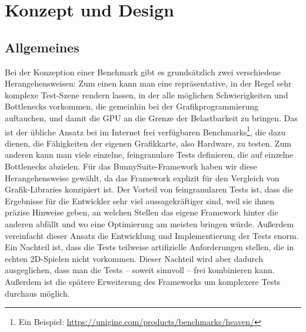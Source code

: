 \chapter{Konzept und Design}
\label{ch:konzept}
\section{Allgemeines}
Bei der Konzeption einer Benchmark gibt es grundsätzlich zwei verschiedene Herangehensweisen: Zum einen kann man eine repräsentative, in der Regel sehr komplexe Test-Szene rendern lassen, in der alle möglichen Schwierigkeiten und Bottlenecks vorkommen, die gemeinhin bei der Grafikprogrammierung auftauchen, und damit die GPU an die Grenze der Belastbarkeit zu bringen. Das ist der übliche Ansatz bei im Internet frei verfügbaren Benchmarks\footnote{Ein Beispiel: \url{https://unigine.com/products/benchmarks/heaven/}}, die dazu dienen, die Fähigkeiten der eigenen Grafikkarte, also Hardware, zu testen. Zum anderen kann man viele einzelne, feingranulare Tests definieren, die auf einzelne Bottlenecks abzielen. Für das BunnySuite-Framework haben wir diese Herangehensweise gewählt, da das Framework explizit für den Vergleich von Grafik-Libraries konzipiert ist. Der Vorteil von feingranularen Tests ist, dass die Ergebnisse für die Entwickler sehr viel aussagekräftiger sind, weil sie ihnen präzise Hinweise geben, an welchen Stellen das eigene Framework hinter die anderen abfällt und wo eine Optimierung am meisten bringen würde. Außerdem vereinfacht dieser Ansatz die Entwicklung und Implementierung der Tests enorm. Ein Nachteil ist, dass die Tests teilweise artifizielle Anforderungen stellen, die in echten 2D-Spielen nicht vorkommen. Dieser Nachteil wird aber dadurch ausgeglichen, dass man die Tests -- soweit sinnvoll -- frei kombinieren kann. Außerdem ist die spätere Erweiterung des Frameworks um komplexere Tests durchaus möglich.

